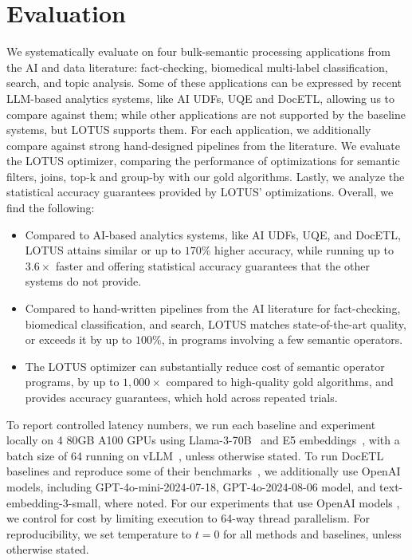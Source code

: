 \section{Evaluation}
\label{sec:eval}
We systematically evaluate \sys on four bulk-semantic processing applications from the AI and data literature:  fact-checking, biomedical multi-label classification, search, and topic analysis. 
Some of these applications can be expressed by recent LLM-based analytics systems, like AI UDFs, UQE and DocETL, allowing us to compare against them; while other applications are not supported by the baseline systems, but LOTUS supports them. For each application, we additionally compare against strong hand-designed pipelines from the literature. We evaluate the LOTUS optimizer, comparing the performance of optimizations for semantic filters, joins, top-k and group-by with our gold algorithms. Lastly, we analyze the statistical accuracy guarantees provided by LOTUS' optimizations. Overall, we find the following:
\begin{itemize}
    \item Compared to AI-based analytics systems, like AI UDFs, UQE, and DocETL, LOTUS attains similar or up to $170\%$ higher accuracy, while running up to $3.6\times$ faster and offering statistical accuracy guarantees that the other systems do not provide.
    \item Compared to hand-written pipelines from the AI literature for fact-checking, biomedical classification, and search, LOTUS matches state-of-the-art quality, or exceeds it by up to $100\%$, in programs involving a few semantic operators.
    \item The LOTUS optimizer can substantially reduce cost of semantic operator programs, by up to $1,000\times$ compared to high-quality gold algorithms, and provides accuracy guarantees, which hold across repeated trials.
\end{itemize}

To report controlled latency numbers, we run each baseline and experiment locally on 4 80GB A100 GPUs using Llama-3-70B~\cite{noauthor_introducing_nodate} and E5 embeddings~\cite{wang_text_2024}, with a batch size of 64 running on vLLM~\cite{kwon_efficient_2023}, unless otherwise stated. To run DocETL baselines and reproduce some of their benchmarks~\cite{shankar_docetl_2024}, we additionally use OpenAI~\cite{noauthor_openai_nodate} models, including GPT-4o-mini-2024-07-18, GPT-4o-2024-08-06 model, and text-embedding-3-small, where noted. For our experiments that use OpenAI models , we control for cost by limiting execution to 64-way thread parallelism. For reproducibility, we set temperature to $t=0$ for all methods and baselines, unless otherwise stated.

